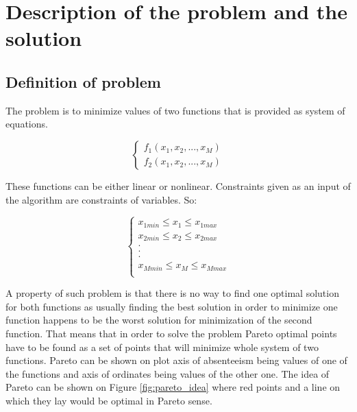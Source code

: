 \documentclass[11pt]{article}
\begin{document}
	\section{Description of the problem and the solution}
	
	\subsection{Definition of problem}
		
	The problem is to minimize values of two functions that is provided as system
	of equations.
	
	$$\begin{cases}
		f_{1}(x_{1},x_{2},...,x_{M})\\
		f_{2}(x_{1},x_{2},...,x_{M})
	\end{cases}$$
	
	These functions can be either linear or nonlinear. Constraints given as an
	input of the algorithm are constraints of variables. So:
	
	$$\begin{cases}
		x_{1min} \leq x_{1} \leq x_{1max}\\
		x_{2min} \leq x_{2} \leq x_{2max}\\
		.\\
		.\\
		.\\
		x_{Mmin} \leq x_{M} \leq x_{Mmax}\\
	\end{cases}$$
	
	A property of such problem is that there is no way to find one optimal solution
	for both functions as usually finding the best solution in order to minimize
	one function happens to be the worst solution for minimization of the second
	function. That means that in order to solve the problem Pareto optimal points 
	have to be found as a set of points that will minimize whole system of two 
	functions. Pareto can be shown on plot axis of absenteeism being values of
	one of the functions and axis of ordinates being values of the other one.
	The idea of Pareto can be shown on Figure \ref{fig:pareto_idea} where red
	points and a line on which they lay would be optimal in Pareto sense.
	
\end{document}
